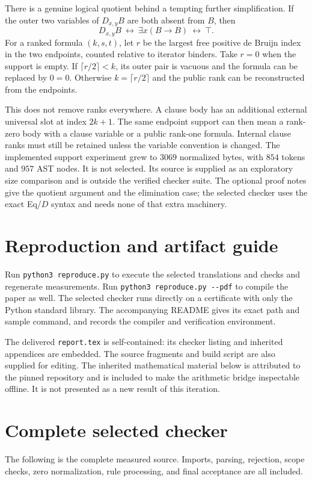 \documentclass[11pt]{article}
\theoremstyle{definition}
\begin{document}
There is a genuine logical quotient behind a tempting further simplification.
If the outer two variables of $D_{x,y}B$ are both absent from $B$, then
\[
 D_{x,y}B\ \leftrightarrow\ \exists x(B\to B)\ \leftrightarrow\ \top.
\]
For a ranked formula $(k,s,t)$, let $r$ be the largest free positive
de Bruijn index in the two endpoints, counted relative to iterator binders.
Take $r=0$ when the support is empty.
If $\lceil r/2\rceil<k$, its outer pair is vacuous and the formula can
be replaced by $0=0$. Otherwise $k=\lceil r/2\rceil$ and the public rank
can be reconstructed from the endpoints.

This does not remove ranks everywhere. A clause body has an additional
external universal slot at index $2k+1$. The same endpoint support can then
mean a rank-zero body with a clause variable or a public rank-one formula.
Internal clause ranks must still be retained unless the variable convention
is changed. The implemented support experiment grew to $3069$ normalized
bytes, with $854$ tokens and $957$ AST nodes. It is not selected.
Its source is supplied as an exploratory size comparison and is outside
the verified checker suite. The optional proof notes give the quotient
argument and the elimination case; the selected checker uses the exact
Eq/$D$ syntax and needs none of that extra machinery.

\section{Reproduction and artifact guide}

Run \verb|python3 reproduce.py| to execute the selected translations and
checks and regenerate measurements. Run
\verb|python3 reproduce.py --pdf| to compile the paper as well.
The selected checker runs directly on a certificate with only the Python
standard library. The accompanying README gives its exact path and sample
command, and records the compiler and verification environment.

The delivered \nolinkurl{report.tex} is self-contained: its checker listing
and inherited appendices are embedded. The source fragments and build
script are also supplied for editing. The inherited mathematical material
below is attributed to the pinned repository and is included to make the
arithmetic bridge inspectable offline. It is not presented as a new result
of this iteration.

\clearpage
\appendix
\section{Complete selected checker}
The following is the complete measured source. Imports, parsing, rejection,
scope checks, zero normalization, rule processing, and final acceptance are
all included.
\end{document}
